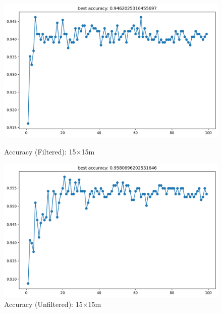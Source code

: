 \documentclass[runningheads]{llncs}
\begin{document}
\begin{figure}[H]
	\centering
	\begin{minipage}{0.49\textwidth}
		\centering
		\includegraphics[width=\textwidth]{figures/filtered/xgbrf_acc_15.png}
		\caption*{Accuracy (Filtered): 15×15m}
	\end{minipage}
	\hfill
	\begin{minipage}{0.49\textwidth}
		\centering
		\includegraphics[width=\textwidth]{figures/unfiltered/xgbrf_acc_15.png}
		\caption*{Accuracy (Unfiltered): 15×15m}
	\end{minipage}
\end{figure}
\end{document}
